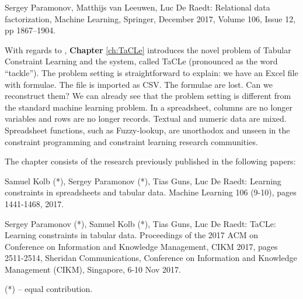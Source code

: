 \begin{addmargin}[2em]{2em}

Sergey Paramonov,  Matthijs van Leeuwen, Luc De Raedt: Relational data
factorization, Machine Learning, Springer, December 2017, Volume 106,
    Issue 12, pp 1867–1904.

\end{addmargin}



With regards to \ctwo,  \textbf{Chapter} \ref{ch:TaCLe} introduces  the novel problem of
Tabular Constraint Learning and the system, called TaCLe (pronounced
as the word ``tackle''). The problem setting is straightforward to
explain: we have an Excel file with formulae. The file is imported as
CSV. The formulae are lost. Can we reconstruct them? We can already 
see that the problem setting is different from the standard machine
learning problem. In a spreadsheet, columns are no longer variables
and rows are no longer records. Textual and numeric data are mixed.
Spreadsheet functions, such as Fuzzy-lookup, are unorthodox and unseen in
the constraint programming and constraint learning research communities.

The chapter consists of the research previously published in the following papers:

\begin{addmargin}[2em]{2em}
Samuel Kolb (*), Sergey Paramonov (*), Tias Guns, Luc De Raedt:
  Learning constraints in spreadsheets and tabular data. Machine
  Learning 106 (9-10), pages 1441-1468, 2017.


Sergey Paramonov (*), Samuel Kolb (*), Tias Guns, Luc De Raedt:
TaCLe: Learning constraints in tabular data. 
 Proceedings of the 2017 ACM on Conference on Information and
    Knowledge Management, CIKM 2017, pages 2511-2514, Sheridan
    Communications, Conference on Information and Knowledge Management
    (CIKM), Singapore, 6-10 Nov 2017.

\pubrev
(*) -- equal contribution.
\pubrevend
\end{addmargin}





